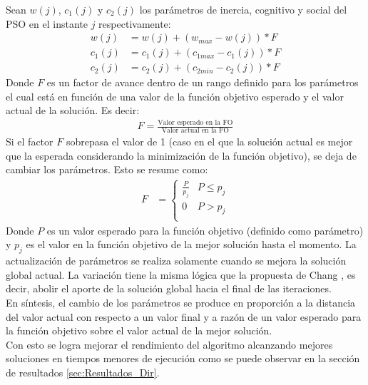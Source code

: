 Sean $w(j)$, $c_1(j)$ y $c_2(j)$ los parámetros de inercia, cognitivo y social del PSO en el instante $j$ respectivamente:  
\begin{align}\label{eq:VariationParameters_new}\label{eq:VariationParameters_new_2}\label{eq:VariationParameters_new_3}
    w(j) &= w(j) + (w_{max} - w(j)) * F \\
    c_{1}(j) &= c_1(j) + (c_{1max} - c_1(j)) * F \\
    c_{2}(j) &= c_2(j) + (c_{2min} - c_2(j)) * F
\end{align} 
Donde $F$ es un factor de avance dentro de un rango definido para los parámetros el cual está en función de una valor de la función objetivo esperado y el valor actual de la solución. Es decir: 
\begin{align}
  F = \frac{\text{Valor esperado en la FO}}{\text{Valor actual en la FO}}
\end{align}
Si el factor $F$ sobrepasa el valor de 1 (caso en el que la solución actual es mejor que la esperada considerando la minimización de la función objetivo), se deja de cambiar los parámetros. Esto se resume como:
\begin{align}\label{eq:restriction_var_par_new}
    F &= 
        \left\{
            \begin{array}{ll}
                \frac{P}{p_j}  & P \leq p_j\\
                0 & P > p_j\\
            \end{array}
        \right.
\end{align}
Donde $P$ es un valor esperado para la función objetivo (definido como parámetro) y $p_j$ es el valor en la función objetivo de la mejor solución hasta el momento. La actualización de parámetros se realiza solamente cuando se mejora la solución global actual. La variación tiene la misma lógica que la propuesta de Chang \cite{Chang10_2}, es decir, abolir el aporte de la solución global hacia el final de las iteraciones.\\
En síntesis, el cambio de los parámetros se produce en proporción a la distancia del valor actual con respecto a un valor final y a razón de un valor esperado para la función objetivo sobre el valor actual de la mejor solución.\\
 Con esto se logra mejorar el rendimiento del algoritmo alcanzando mejores soluciones en tiempos menores de ejecución como se puede observar en la sección de resultados \ref{sec:Resultados_Dir}.

